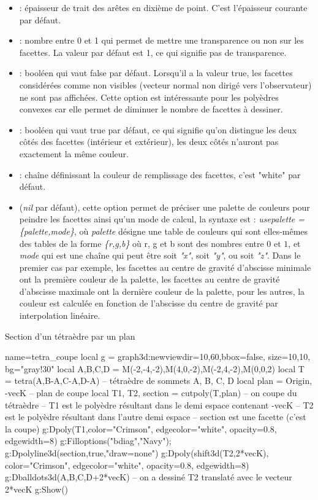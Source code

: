 \begin{itemize}
        \item {} : épaisseur de trait des arêtes en dixième de point. C'est l'épaisseur courante par défaut.
        \item {} : nombre entre 0 et 1 qui permet de mettre une transparence ou non sur les facettes. La valeur par défaut est 1, ce qui signifie pas de transparence.
        \item {} : booléen qui vaut false par défaut. Lorsqu'il a la valeur true, les facettes considérées comme non visibles (vecteur normal non dirigé vers l'observateur) ne sont pas affichées. Cette option est intéressante pour les polyèdres convexes car elle permet de diminuer le nombre de facettes à dessiner.
        \item {} : booléen qui vaut true par défaut, ce qui signifie qu'on distingue les deux côtés des facettes (intérieur et extérieur), les deux côtés n'auront pas exactement la même couleur.
        \item {} : chaîne définissant la couleur de remplissage des facettes, c'est "white" par défaut.
        \item {} (\emph{nil} par défaut), cette option permet de préciser une palette de couleurs pour peindre les facettes ainsi qu'un mode de calcul, la syntaxe est : \emph{usepalette = \{palette,mode\}}, où \emph{palette} désigne une table de couleurs qui sont elles-mêmes des tables de la forme \emph{\{r,g,b\}} où r, g et b sont des nombres entre $0$ et $1$, et \emph{mode} qui est une chaîne qui peut être soit \emph{"x"}, soit \emph{"y"}, ou soit \emph{"z"}. Dans le premier cas par exemple, les facettes au centre de gravité d'abscisse minimale ont la première couleur de la palette, les facettes au centre de gravité d'abscisse maximale ont la dernière couleur de la palette, pour les autres, la couleur est calculée en fonction de l'abscisse du centre de gravité par interpolation linéaire.
\end{itemize}

\begin{demo}{Section d'un tétraèdre par un plan}
\begin{luadraw}{name=tetra_coupe}
local g = graph3d:new{viewdir={10,60},bbox=false, size={10,10}, bg="gray!30"}
local A,B,C,D = M(-2,-4,-2),M(4,0,-2),M(-2,4,-2),M(0,0,2)
local T = tetra(A,B-A,C-A,D-A) -- tétraèdre de sommets A, B, C, D
local plan = {Origin, -vecK}  -- plan de coupe
local T1, T2, section = cutpoly(T,plan) -- on coupe du tétraèdre
-- T1 est le polyèdre résultant dans le demi espace contenant -vecK
-- T2 est le polyèdre résultant dans l'autre demi espace
-- section est une facette (c'est la coupe)
g:Dpoly(T1,{color="Crimson", edgecolor="white", opacity=0.8, edgewidth=8})
g:Filloptions("bdiag","Navy"); g:Dpolyline3d(section,true,"draw=none")
g:Dpoly(shift3d(T2,2*vecK), {color="Crimson", edgecolor="white", opacity=0.8, edgewidth=8})
g:Dballdots3d({A,B,C,D+2*vecK}) -- on a dessiné T2 translaté avec le vecteur 2*vecK
g:Show()
\end{luadraw}
\end{demo}

